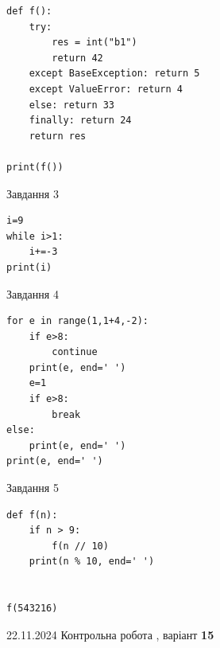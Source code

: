 \documentclass[12pt, ukrainian]{article}
\begin{document}
{{{{{{{{{{{{{{\begin{minipage}[t]{8.5cm}
\begin{verbatim}
def f():
    try:
        res = int("b1")
        return 42
    except BaseException: return 5
    except ValueError: return 4
    else: return 33
    finally: return 24
    return res

print(f())
\end{verbatim}


\vspace{5mm}
               
{\begin{center}Завдання {3}\end{center}}
\vspace{-6mm}

\begin{verbatim}
i=9
while i>1:
    i+=-3
print(i)
\end{verbatim}


\end{minipage}
\vline \hspace{6mm}
\begin{minipage}[t]{10.7cm}
               
{\begin{center}Завдання {4}\end{center}}
\vspace{-6mm}

\begin{verbatim}
for e in range(1,1+4,-2):
    if e>8:
        continue
    print(e, end=' ')
    e=1
    if e>8:
        break
else:
    print(e, end=' ')
print(e, end=' ')
\end{verbatim}


\vspace{5mm}
               
{\begin{center}Завдання {5}\end{center}}
\vspace{-6mm}

\begin{verbatim}
def f(n):
    if n > 9:
        f(n // 10)
    print(n % 10, end=' ')
    

f(543216)
\end{verbatim}


\end{minipage}

\newpage

{{22.11.2024 Контрольна робота , варіант  \No \textbf { 15 }\par}}
{

}}}}}}}}}}}}}}}
\end{document}
